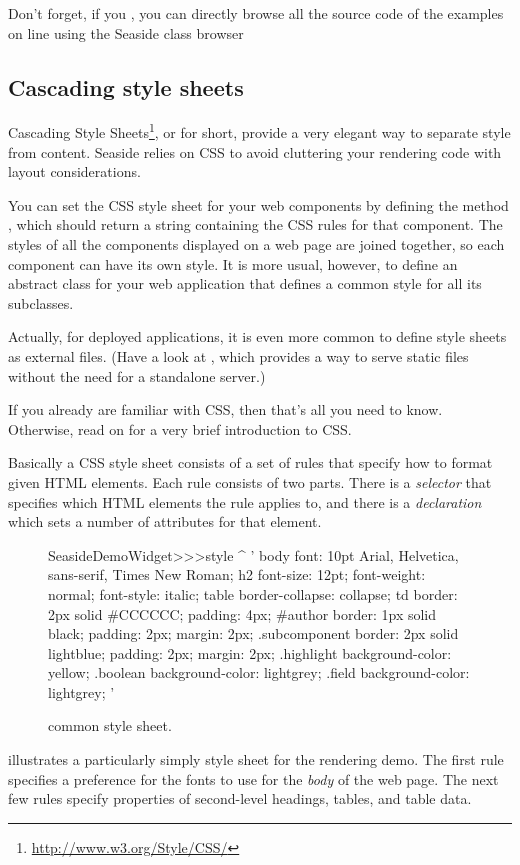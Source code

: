 \documentclass[a4paper,10pt,twoside]{book}
\begin{document}
Don't forget, if you , you can directly browse all the source code of the examples on line using the Seaside class browser

\subsection{Cascading style sheets}
\label{sec:css}

Cascading Style Sheets\footnote{\url{http://www.w3.org/Style/CSS/}}, or  for short, provide a very elegant way to separate style from content.
Seaside relies on CSS to avoid cluttering your rendering code with layout considerations.

You can set the CSS style sheet for your web components by defining the method , which should return a string containing the CSS rules for that component.
The styles of all the components displayed on a web page are joined together, so each component can have its own style.
It is more usual, however, to define an abstract class for your web application that defines a common style for all its subclasses.

Actually, for deployed applications, it is even more common to define style sheets as external files.
(Have a look at , which provides a way to serve static files without the need for a standalone server.)

If you already are familiar with CSS, then that's all you need to know.
Otherwise, read on for a very brief introduction to CSS.

Basically a CSS style sheet consists of a set of rules that specify how to format given HTML elements.
Each rule consists of two parts.
There is a \emph{selector} that specifies which HTML elements the rule applies to, and there is a \emph{declaration} which sets a number of attributes for that element.

\begin{figure}[tb]
\begin{code}{}
SeasideDemoWidget>>>style
	^ '
body {
	font: 10pt Arial, Helvetica, sans-serif, Times New Roman;
}
h2 {
	font-size: 12pt;
	font-weight: normal;
	font-style: italic;
}
table { border-collapse: collapse; }
td {
	border: 2px solid #CCCCCC;
	padding: 4px;
}
#author {
	border: 1px solid black;
	padding: 2px;
	margin: 2px;
}
.subcomponent {
	border: 2px solid lightblue;
	padding: 2px;
	margin: 2px;
}
.highlight { background-color: yellow; }
.boolean { background-color: lightgrey; }
.field { background-color: lightgrey; }
'
\end{code}
\caption{ common style sheet.
\label{fig:democss}}
\end{figure}
 illustrates a particularly simply style sheet for the rendering demo.
The first rule specifies a preference for the fonts to use for the \emph{body} of the web page.
The next few rules specify properties of second-level headings, tables, and table data.
\end{document}
